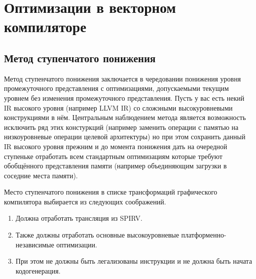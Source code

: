 \chapter{Оптимизации в векторном компиляторе}\label{ch:lowering}

\section{Метод ступенчатого понижения}\label{sec:lowering/passes}

Метод ступенчатого понижения заключается в чередовании понижения уровня промежуточного представления с оптимизациями, допускаемыми текущим уровнем без изменения промежуточного представления. Пусть у вас есть некий IR высокого уровня (например LLVM IR) со сложэными высокуровневыми конструкциями в нём. Центральным наблюдением метода является возможность исключить ряд этих констуркций (например заменить операции с памятью на низкоуровневые операции целевой архитектуры) но при этом сохранить данный IR высокого уровня прежним и до момента понижения дать на очередной ступеньке отработать всем стандартным оптимизациям которые требуют обобщённого представления памяти (например объединяющим загрузки в соседние места памяти).

Место ступенчатого понижения в списке трансформаций графического компилятора выбирается из следующих соображений.

\begin{enumerate}
\item Должна отработать трансляция из SPIRV.
\item Также должны отработать основные высокоуровневые платформенно-независимые оптимизации.
\item При этом не должны быть легализованы инструкции и не должна быть начата кодогенерация.
\end{enumerate}


